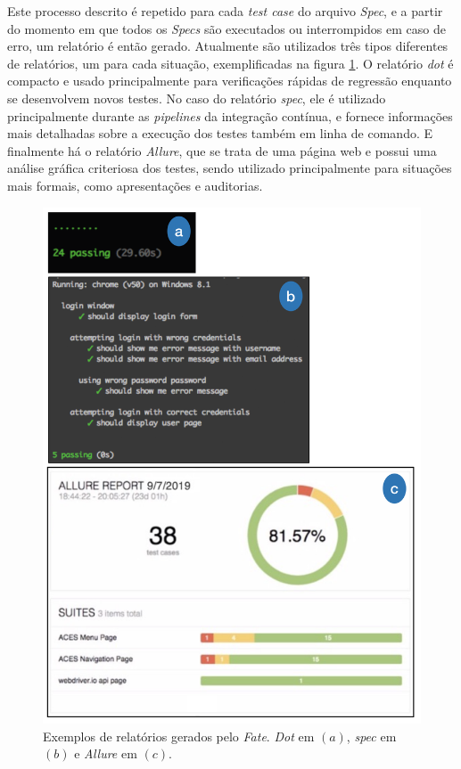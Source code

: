 Este processo descrito é repetido para cada \emph{test case} do arquivo \emph{Spec}, e a partir do momento em que todos os \emph{Specs} são executados ou interrompidos em caso de erro, um relatório é então gerado. Atualmente são utilizados três tipos diferentes de relatórios, um para cada situação, exemplificadas na figura \ref{fig:allure-report}. O relatório \emph{dot} é compacto e usado principalmente para verificações rápidas de regressão enquanto se desenvolvem novos testes. No caso do relatório \emph{spec}, ele é utilizado principalmente durante as \emph{pipelines} da integração contínua, e fornece informações mais detalhadas sobre a execução dos testes também em linha de comando. E finalmente há o relatório \emph{Allure}, que se trata de uma página web e possui uma análise gráfica criteriosa dos testes, sendo utilizado principalmente para situações mais formais, como apresentações e auditorias.

\begin{figure}[H]
    \centering
    \includegraphics[width=13cm]{source/4-solucao/images/fate-reporters-vertical.png}
    \caption{Exemplos de relatórios gerados pelo \emph{Fate}. \emph{Dot} em $(a)$, \emph{spec} em $(b)$ e \emph{Allure} em $(c)$.}
    \label{fig:allure-report}
\end{figure}

